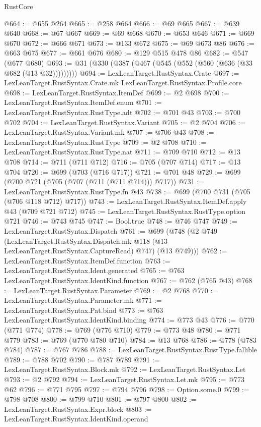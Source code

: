\begin{lexlean}{RustCore}
\begin{coremodule}
@664 := @655 @264
@665 := @258 @664
@666 := @69 @665
@667 := @639 @640
@668 := @67 @667
@669 := @69 @668
@670 := @653 @646
@671 := @669 @670
@672 := @666 @671
@673 := @133 @672
@675 := @69 @673 @86
@676 := @663 @675
@677 := @661 @676
@680 := @129 @515 @478 @86
@682 := @547 (@677 @680)
@693 := @31 (@330 (@387 (@467 (@545 (@552 (@560 (@636 (@33 @682 (@13 @32)))))))))
@694 := LexLeanTarget.RustSyntax.Crate
@697 := LexLeanTarget.RustSyntax.Crate.mk LexLeanTarget.RustSyntax.Profile.core
@698 := LexLeanTarget.RustSyntax.ItemDef
@699 := @2 @698
@700 := LexLeanTarget.RustSyntax.ItemDef.enum
@701 := LexLeanTarget.RustSyntax.RustType.adt
@702 := @701 @43
@703 := @700 @702
@704 := LexLeanTarget.RustSyntax.Variant
@705 := @2 @704
@706 := LexLeanTarget.RustSyntax.Variant.mk
@707 := @706 @43
@708 := LexLeanTarget.RustSyntax.RustType
@709 := @2 @708
@710 := LexLeanTarget.RustSyntax.RustType.nat
@711 := @709 @710
@712 := @13 @708
@714 := @711 (@711 @712)
@716 := @705 (@707 @714)
@717 := @13 @704
@720 := @699 (@703 (@716 @717))
@721 := @701 @48
@729 := @699 (@700 @721 (@705 (@707 (@711 (@711 @714))) @717))
@731 := LexLeanTarget.RustSyntax.RustType.fn @43
@738 := @699 (@700 @731 (@705 (@706 @118 @712) @717))
@743 := LexLeanTarget.RustSyntax.ItemDef.apply @43 (@709 @721 @712)
@745 := LexLeanTarget.RustSyntax.RustType.option @721
@746 := @743 @745
@747 := Bool.true
@748 := @746 @747
@749 := LexLeanTarget.RustSyntax.Dispatch
@761 := @699
    (@748
      (@2
        @749
        (LexLeanTarget.RustSyntax.Dispatch.mk @118 (@13 LexLeanTarget.RustSyntax.CaptureRead) @747)
        (@13 @749)))
@762 := LexLeanTarget.RustSyntax.ItemDef.function
@763 := LexLeanTarget.RustSyntax.Ident.generated
@765 := @763 LexLeanTarget.RustSyntax.IdentKind.function
@767 := @762 (@765 @43)
@768 := LexLeanTarget.RustSyntax.Parameter
@769 := @2 @768
@770 := LexLeanTarget.RustSyntax.Parameter.mk
@771 := LexLeanTarget.RustSyntax.Pat.bind
@773 := @763 LexLeanTarget.RustSyntax.IdentKind.binding
@774 := @773 @43
@776 := @770 (@771 @774)
@778 := @769 (@776 @710)
@779 := @773 @48
@780 := @771 @779
@783 := @769 (@770 @780 @710)
@784 := @13 @768
@786 := @778 (@783 @784)
@787 := @767 @786
@788 := LexLeanTarget.RustSyntax.RustType.fallible
@789 := @788 @702
@790 := @787 @789
@791 := LexLeanTarget.RustSyntax.Block.mk
@792 := LexLeanTarget.RustSyntax.Let
@793 := @2 @792
@794 := LexLeanTarget.RustSyntax.Let.mk
@795 := @773 @62
@796 := @771 @795
@797 := @794 @796
@798 := Option.some.{0}
@799 := @798 @708
@800 := @799 @710
@801 := @797 @800
@802 := LexLeanTarget.RustSyntax.Expr.block
@803 := LexLeanTarget.RustSyntax.IdentKind.operand

\end{coremodule}
\end{lexlean}
